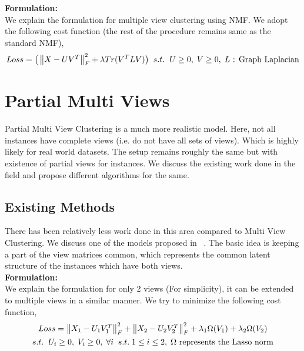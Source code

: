 \documentclass[a4paper]{article}
\begin{document}
	\noindent
	\textbf{Formulation:}\\
	We explain the formulation for multiple view clustering using NMF. We adopt the following cost function (the rest of the procedure remains same as the standard NMF),
	\begin{multline}	
	\hfill Loss = \big(\begin{Vmatrix} X-UV^{T} \end{Vmatrix}^{2}_{F}	
		+ \lambda Tr(V^{T} L V) \big) \;\; s.t. \hspace{2mm}  U\geq0,\; V\geq0,\;L\text{ : Graph Laplacian}
	\end{multline}	

	\section{Partial Multi Views}

Partial Multi View Clustering is a much more realistic model. Here, not all instances have complete views (i.e. do not have all sets of views). Which is highly likely for real world datasets. The setup remains roughly the same but with existence of partial views for instances. We discuss the existing work done in the field and propose different algorithms for the same.

	\subsection{Existing Methods}

	There has been relatively less work done in this area compared to Multi View Clustering. We discuss one of the models proposed in ~\cite{pvc15}. The basic idea is keeping a part of the view matrices common, which represents the common latent structure of the instances which have both views.\\
	
	\noindent
	\textbf{Formulation:}\\
	We explain the formulation for only 2 views (For simplicity), it can be extended to multiple views in a similar manner. We try to minimize the following cost function,
	\begin{multline*}
	Loss = \begin{Vmatrix} X_{1}-U_{1}V^{T}_{1} \end{Vmatrix}^{2}_{F}	
		+ \begin{Vmatrix} X_{2}-U_{2}V^{T}_{2} \end{Vmatrix}^{2}_{F}
		+ \lambda_{1} \Omega(V_{1}) + \lambda_{2} \Omega (V_{2})\\	
		s.t. \hspace{2mm}  U_{i}\geq0,\;V_{i}\geq0,\;\forall i \;\;s.t.\; 1 \leq i \leq 2,
		\; \Omega \text{ represents the Lasso norm}
	\end{multline*}
\end{document}
